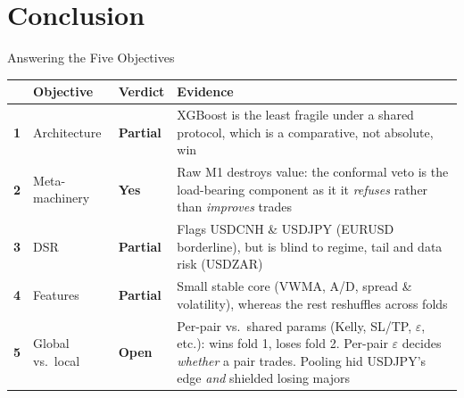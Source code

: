 \documentclass[aspectratio=169, 11pt]{beamer}
\newcommand{\hl}[1]{\textcolor{unibored}{\textbf{#1}}}
\newcommand{\pos}[1]{\textcolor{good}{\textbf{#1}}}
\newcommand{\negv}[1]{\textcolor{bad}{\textbf{#1}}}
\begin{document}
\section{Conclusion}

\begin{frame}{Answering the Five Objectives}
  \small
  \renewcommand{\arraystretch}{1.25}
  \begin{tabular}{@{}p{}p{}p{}p{}@{}}
    \toprule
    & \textbf{Objective} & \textbf{Verdict} & \textbf{Evidence} \\
    \midrule
    \hl{1} & Architecture & \pos{Partial} & XGBoost is the least fragile under a shared protocol, which is a comparative, not absolute, win \\
    \hl{2} & Meta-machinery & \pos{Yes} & Raw M1 destroys value: the conformal veto is the load-bearing component as it it \emph{refuses} rather than \emph{improves} trades \\
    \hl{3} & DSR & \pos{Partial} & Flags USDCNH \& USDJPY (EURUSD borderline), but is blind to regime, tail and data risk (USDZAR) \\
    \hl{4} & Features & \pos{Partial} & Small stable core (VWMA, A/D, spread \& volatility), whereas the rest reshuffles across folds \\
    \hl{5} & Global vs.\ local & \negv{Open} & Per-pair vs.\ shared params (Kelly, SL/TP, $\varepsilon$, etc.): wins fold 1, loses fold 2. Per-pair $\varepsilon$ decides \emph{whether} a pair trades. Pooling hid USDJPY's edge \emph{and} shielded losing majors \\
    \bottomrule
  \end{tabular}
\end{frame}
\end{document}

